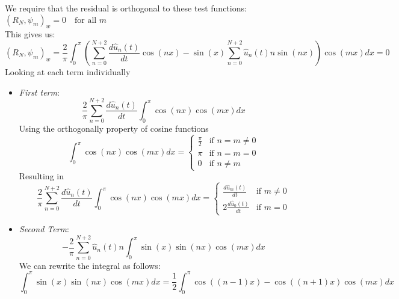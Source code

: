 We require that the residual is orthogonal to these test functions:
$(R_N, \psi_m)_w = 0 \quad \text{for all } m$\\
This gives us:
\begin{equation}
	\left(R_N, \psi_m\right)_w  = \frac{2}{\pi} \int_0^{\pi} \left ( \sum_{n=0}^{N+2} \frac{d\hat{u}_n(t)}{dt} \cos(nx) - \sin(x)  \sum_{n=0}^{N+2} \hat{u}_n(t) n \sin(nx) \right) \cos(mx) dx = 0
	\label{eq:res_der}
\end{equation}
Looking at each term individually
\begin{itemize}
	\item \textit{First term}:
	      \begin{equation}
		      \frac{2}{\pi}\sum_{n=0}^{N+2} \frac{d\hat{u}_n(t)}{dt} \int_0^\pi \cos(nx) \cos(mx) dx
		      \label{eq:ft3}
	      \end{equation}
	      Using the orthogonally property of cosine functions
	      \begin{equation}
		      \int_0^{\pi} \cos(nx)\cos(mx)dx = \begin{cases}
			      \frac{\pi}{2} & \text{if } n = m \neq 0 \\
			      \pi           & \text{if } n = m = 0    \\
			      0             & \text{if } n \neq m
		      \end{cases}
		      \label{eq:case}
	      \end{equation}
	      Resulting in
	      \begin{equation}
		      \frac{2}{\pi}\sum_{n=0}^{N+2} \frac{d\hat{u}_n(t)}{dt}\int_0^{\pi} \cos(nx)\cos(mx)dx = \begin{cases}
			      \frac{d\hat{u}_m(t)}{dt}  & \text{if } m \neq 0 \\
			      2\frac{d\hat{u}_0(t)}{dt} & \text{if } m = 0
		      \end{cases}
		      \label{eq:cases2}
	      \end{equation}
	\item \textit{Second Term}:
	      \begin{equation}
		      -\frac{2}{\pi}\sum_{n=0}^{N+2} \hat{u}_n(t) n \int_0^\pi \sin(x) \sin(nx) \cos(mx) dx
		      \label{eq:sterm}
	      \end{equation}
	      We can rewrite the integral as follows:
	      \begin{equation}
		      \int_0^\pi \sin(x) \sin(nx) \cos(mx) dx = \frac{1}{2}\int_0^{\pi} \cos((n-1)x) - \cos((n+1)x) \cos(mx) dx
		      \label{eq:oou}
	      \end{equation}

\end{itemize}
